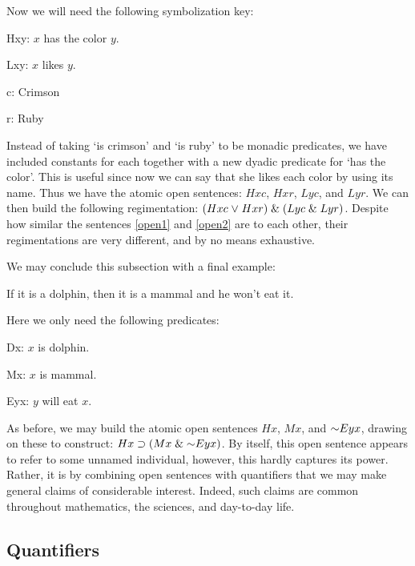 Now we will need the following symbolization key:

\begin{ekey}
\item[Hxy:] $x$ has the color $y$.
\item[Lxy:] $x$ likes $y$.
\item[c:] Crimson
\item[r:] Ruby
\end{ekey}

Instead of taking `is crimson' and `is ruby' to be monadic predicates, we have included constants for each together with a new dyadic predicate for `has the color'.
This is useful since now we can say that she likes each color by using its name.
Thus we have the atomic open sentences: $Hxc$, $Hxr$, $Lyc$, and $Lyr$.
We can then build the following regimentation: $(Hxc \mkern1mu\vee\mkern1mu Hxr) \mathrel\& (Lyc \mathrel\& Lyr)$.
Despite how similar the sentences \ref{open1} and \ref{open2} are to each other, their regimentations are very different, and by no means exhaustive.

We may conclude this subsection with a final example:

\begin{earg}
\item[\ex{open3}] If it is a dolphin, then it is a mammal and he won't eat it.
\end{earg}

Here we only need the following predicates:

\begin{ekey}
\item[Dx:] $x$ is dolphin.
\item[Mx:] $x$ is mammal.
\item[Eyx:] $y$ will eat $x$.
\end{ekey}

As before, we may build the atomic open sentences $Hx$, $Mx$, and $\enot Eyx$, drawing on these to construct: $Hx \eif (Mx \eand \enot Eyx)$.
By itself, this open sentence appears to refer to some unnamed individual, however, this hardly captures its power.
Rather, it is by combining open sentences with quantifiers that we may make general claims of considerable interest.
Indeed, such claims are common throughout mathematics, the sciences, and day-to-day life.



\subsection{Quantifiers}


